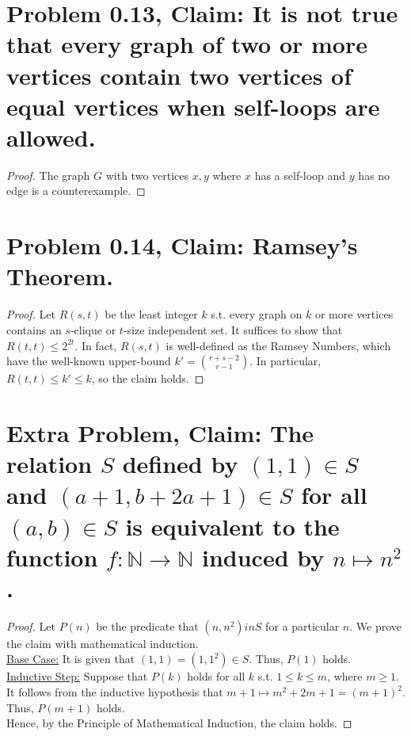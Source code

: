 \documentclass[12pt]{article}
\begin{document}
\section*{Problem 0.13, Claim: It is not true that every graph of two or more vertices contain two vertices of equal vertices when self-loops are allowed.}
\begin{proof}
The graph $G$ with two vertices $x, y$ where $x$ has a self-loop and $y$ has no edge is a counterexample.
\end{proof}

\section*{Problem 0.14, Claim: Ramsey's Theorem.}
\begin{proof}
	Let $R(s, t)$ be the least integer $k$ s.t. every graph on $k$ or more vertices contains an $s$-clique or $t$-size independent set. It suffices to show that $R(t, t) \leq 2^{2t}$. In fact, $R(s, t)$ is well-defined as the Ramsey Numbers, which have the well-known upper-bound $k' = {r + s - 2 \choose r - 1}$. In particular, $R(t, t) \leq k' \leq k$, so the claim holds.
\end{proof}

\section*{Extra Problem, Claim: The relation $S$ defined by $(1, 1) \in S$ and $(a + 1, b + 2a + 1) \in S$ for all $(a, b) \in S$ is equivalent to the function $f: \mathbb{N} \rightarrow \mathbb{N}$ induced by $n \mapsto n^{2}$.}
\begin{proof}
	Let $P(n)$ be the predicate that $(n, n^{2}) in S$ for a particular $n$. We prove the claim with mathematical induction. \\
	\newline
	\underline{Base Case:} It is given that $(1, 1) = (1, 1^{2}) \in S$. Thus, $P(1)$ holds. \\
	\newline
	\underline{Inductive Step:} Suppose that $P(k)$ holds for all $k$ s.t. $1 \leq k \leq m$, where $m \geq 1$. It follows from the inductive hypothesis that $m + 1 \mapsto m^{2} + 2m + 1 = (m + 1)^{2}$. Thus, $P(m + 1)$ holds. \\
	\newline
	Hence, by the Principle of Mathematical Induction, the claim holds.
\end{proof}
\end{document}
